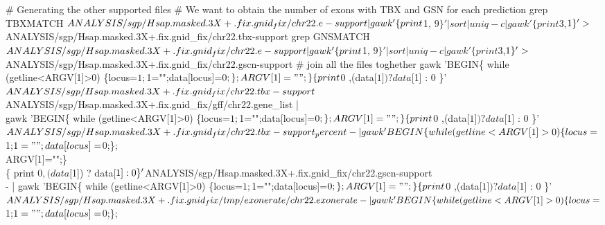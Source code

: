 \documentclass[11pt]{article}
\begin{document}
# Generating the other supported files
# We want to obtain the number of exons with TBX and GSN for each prediction
  grep TBXMATCH $ANALYSIS/sgp/Hsap.masked.3X+.fix.gnid_fix/chr22.e-support \\
      | gawk '\{print $1, $9\}' | sort | uniq -c | gawk '\{print  $3,$1\}' \\
     > $ANALYSIS/sgp/Hsap.masked.3X+.fix.gnid_fix/chr22.tbx-support
  grep GNSMATCH $ANALYSIS/sgp/Hsap.masked.3X+.fix.gnid_fix/chr22.e-support \\
      | gawk '\{print $1, $9\}' | sort | uniq -c | gawk '\{print  $3,$1\}' \\
     > $ANALYSIS/sgp/Hsap.masked.3X+.fix.gnid_fix/chr22.gscn-support
# join all the files toghether
gawk 'BEGIN\{ while (getline<ARGV[1]>0) \{locus=$1;$1="";data[locus]=$0;\}; \\
        ARGV[1]="";\} \\
      \{ print $0 ,(data[$1]) ? data[$1] : 0  \}' \\
      $ANALYSIS/sgp/Hsap.masked.3X+.fix.gnid_fix/chr22.tbx-support \\
      $ANALYSIS/sgp/Hsap.masked.3X+.fix.gnid_fix/gff/chr22.gene_list | \\
gawk 'BEGIN\{ while (getline<ARGV[1]>0) \{locus=$1;$1="";data[locus]=$0;\}; \\
        ARGV[1]="";\} \\
      \{ print $0 ,(data[$1]) ? data[$1] : 0  \}' \\
      $ANALYSIS/sgp/Hsap.masked.3X+.fix.gnid_fix/chr22.tbx-support_percent \\
       -   |
gawk 'BEGIN\{ while (getline<ARGV[1]>0) \{locus=$1;$1="";data[locus]=$0;\}; \\
         ARGV[1]="";\} \\
       \{ print $0 ,(data[$1]) ? data[$1] : 0  \}' \\
      $ANALYSIS/sgp/Hsap.masked.3X+.fix.gnid_fix/chr22.gscn-support \\
      -   | 
gawk 'BEGIN\{ while (getline<ARGV[1]>0) \{locus=$1;$1="";data[locus]=$0;\}; \\
         ARGV[1]="";\} \\
       \{ print $0 ,(data[$1]) ? data[$1] : 0  \}' \\
      $ANALYSIS/sgp/Hsap.masked.3X+.fix.gnid_fix/tmp/exonerate/chr22.exonerate \\
      -   | 
gawk 'BEGIN\{ while (getline<ARGV[1]>0) \{locus=$1;$1="";data[locus]=$0;\}; \\
\end{document}
